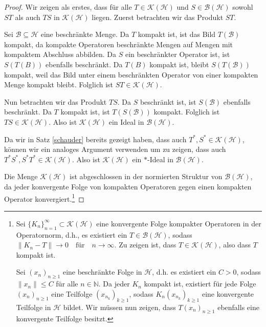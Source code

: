 \documentclass[11pt, hidelinks]{article}
\numberwithin{conj}{section}
\begin{document}
\begin{proof}
Wir zeigen als erstes, dass für alle $T \in \mathcal{K}(\mathcal{H})$ und $S \in \mathcal{B}(\mathcal{H})$ sowohl $ST$ als auch $TS$ in $\mathcal{K}(\mathcal{H})$ liegen. Zuerst betrachten wir das Produkt $ST$.

Sei $\mathcal{B} \subseteq \mathcal{H}$ eine beschränkte Menge. Da $T$ kompakt ist, ist das Bild $T(\mathcal{B})$ kompakt, da kompakte Operatoren beschränkte Mengen auf Mengen mit kompaktem Abschluss abbilden. Da $S$ ein beschränkter Operator ist, ist $S(T(B))$ ebenfalls beschränkt. Da $T(B)$ kompakt ist, bleibt $S(T(\mathcal{B}))$ kompakt, weil das Bild unter einem beschränkten Operator von einer kompakten Menge kompakt bleibt. Folglich ist $ST \in \mathcal{K}(\mathcal{H})$.

Nun betrachten wir das Produkt $TS$. Da $S$ beschränkt ist, ist $S(\mathcal{B})$ ebenfalls beschränkt. Da $T$ kompakt ist, ist $T(S(\mathcal{B}))$ kompakt. Folglich ist $TS \in \mathcal{K}(\mathcal{H})$. Also ist $\mathcal{K}(\mathcal{H})$ ein Ideal in $\mathcal{B}(\mathcal{H})$. 

Da wir in Satz \ref{schauder} bereits gezeigt haben, dass auch $T^\ast, S^\ast \in \mathcal{K}(\mathcal{H})$, können wir ein analoges Argument verwenden um zu zeigen, dass auch $T^\ast S^\ast, S^\ast T^\ast \in \mathcal{K}(\mathcal{H})$. Also ist $\mathcal{K}(\mathcal{H})$ ein $\ast$-Ideal in $\mathcal{B}(\mathcal{H})$.

Die Menge $\mathcal{K}(\mathcal{H})$ ist abgeschlossen in der normierten Struktur von $\mathcal{B}(\mathcal{H})$, da jeder konvergente Folge von kompakten Operatoren gegen einen kompakten Operator konvergiert.\footnote{Sei \(\{K_n\}_{n=1}^{\infty} \subset \mathcal{K}(\mathcal{H})\) eine konvergente Folge kompakter Operatoren in der Operatornorm, d.h., es existiert ein \(T \in \mathcal{B}(\mathcal{H})\), sodass $\|K_n - T\| \to 0 \quad \text{für} \quad n \to \infty$. Zu zeigen ist, dass \(T \in \mathcal{K}(\mathcal{H})\), also dass \(T\) kompakt ist.

Sei \((x_n)_{n\geq 1}\) eine beschränkte Folge in \(\mathcal{H}\), d.h. es existiert ein \(C > 0\), sodass \(\|x_n\| \leq C\) für alle \(n \in \mathbb{N}\). Da jeder \(K_n\) kompakt ist, existiert für jede Folge \((x_n)_{n\geq 1}\) eine Teilfolge \((x_{n_k})_{k\geq 1}\), sodass \(K_n(x_{n_k})_{k\geq 1}\) eine konvergente Teilfolge in \(\mathcal{H}\) bildet. Wir müssen nun zeigen, dass \(T(x_n)_{n\geq 1}\) ebenfalls eine konvergente Teilfolge besitzt.

}
\end{proof}
\end{document}

